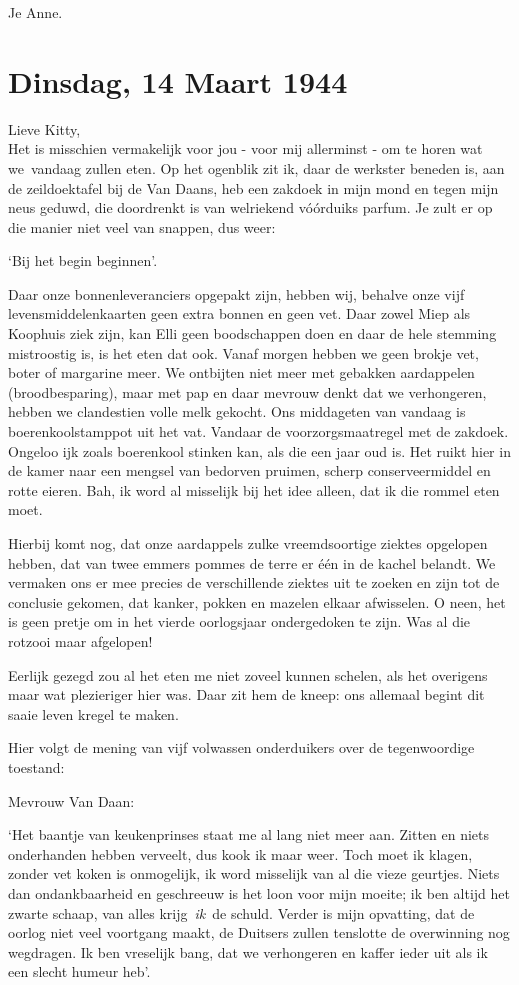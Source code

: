 \documentclass{book}
\begin{document}
Je Anne.

\chapter{Dinsdag, 14 Maart 1944}

Lieve Kitty,\\Het is misschien vermakelijk voor jou - voor mij
allerminst - om te horen wat we~vandaag zullen eten. Op het ogenblik zit
ik, daar de werkster beneden is, aan de zeildoektafel bij de Van Daans,
heb een zakdoek in mijn mond en tegen mijn neus geduwd, die doordrenkt
is van welriekend vóórduiks parfum. Je zult er op die manier niet veel
van snappen, dus weer:

`Bij het begin beginnen'.

Daar onze bonnenleveranciers opgepakt zijn, hebben wij, behalve onze
vijf levensmiddelenkaarten geen extra bonnen en geen vet. Daar zowel
Miep als Koophuis ziek zijn, kan Elli geen boodschappen doen en daar de
hele stemming mistroostig is, is het eten dat ook. Vanaf morgen hebben
we geen brokje vet, boter of margarine meer. We ontbijten niet meer met
gebakken aardappelen (broodbesparing), maar met pap en daar mevrouw
denkt dat we verhongeren, hebben we clandestien volle melk gekocht. Ons
middageten van vandaag is boerenkoolstamppot uit het vat. Vandaar de
voorzorgsmaatregel met de zakdoek. Ongeloo ijk zoals boerenkool stinken
kan, als die een jaar oud is. Het ruikt hier in de kamer naar een
mengsel van bedorven pruimen, scherp conserveermiddel en rotte eieren.
Bah, ik word al misselijk bij het idee alleen, dat ik die rommel eten
moet.

Hierbij komt nog, dat onze aardappels zulke vreemdsoortige ziektes
opgelopen hebben, dat van twee emmers pommes de terre er één in de
kachel belandt. We vermaken ons er mee precies de verschillende ziektes
uit te zoeken en zijn tot de conclusie gekomen, dat kanker, pokken en
mazelen elkaar afwisselen. O neen, het is geen pretje om in het vierde
oorlogsjaar ondergedoken te zijn. Was al die rotzooi maar afgelopen!

Eerlijk gezegd zou al het eten me niet zoveel kunnen schelen, als het
overigens maar wat plezieriger hier was. Daar zit hem de kneep: ons
allemaal begint dit saaie leven kregel te maken.

Hier volgt de mening van vijf volwassen onderduikers over de
tegenwoordige toestand:

Mevrouw Van Daan:

`Het baantje van keukenprinses staat me al lang niet meer aan. Zitten en
niets onderhanden hebben verveelt, dus kook ik maar weer. Toch moet ik
klagen, zonder vet koken is onmogelijk, ik word misselijk van al die
vieze geurtjes. Niets dan ondankbaarheid en geschreeuw is het loon voor
mijn moeite; ik ben altijd het zwarte schaap, van alles
krijg~\emph{ik}~de schuld. Verder is mijn opvatting, dat de oorlog niet
veel voortgang maakt, de Duitsers zullen tenslotte de overwinning nog
wegdragen. Ik ben vreselijk bang, dat we verhongeren en kaffer ieder uit
als ik een slecht humeur heb'.
\end{document}
